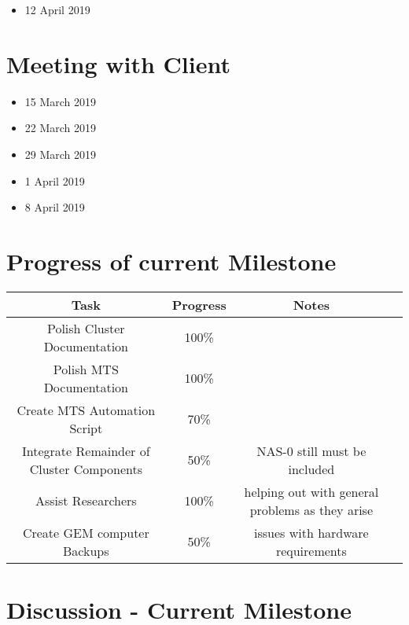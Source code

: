 \documentclass[12pt]{article}
\begin{document}
\begin{itemize}
	\item 12 April 2019
\end{itemize}
\section{Meeting with Client}

\begin{itemize}
	\item 15 March 2019
	\item 22 March 2019
	\item 29 March 2019
	\item 1 April 2019
	\item 8 April 2019
\end{itemize}

\section{Progress of current Milestone}

\begin{adjustwidth}{-2.5cm}{}
  \begin{center}
      \begin{tabular}{|c|c|c|c|}
    	\hline
    	Task & Progress & Notes\\
    	\hline
    	Polish Cluster Documentation & 100\% & \\
    	Polish MTS Documentation & 100\% &  \\
    	Create MTS Automation Script & 70\% &  \\
    	Integrate Remainder of Cluster Components & 50\% & NAS-0 still must be
                                               included \\
    	Assist Researchers & 100\% & helping out with general problems as they
                                     arise \\
        Create GEM computer Backups & 50\% & issues with
        									hardware requirements \\
        
    	\hline
    \end{tabular}
  \end{center}
\end{adjustwidth}



\section{Discussion - Current Milestone}
\end{document}
